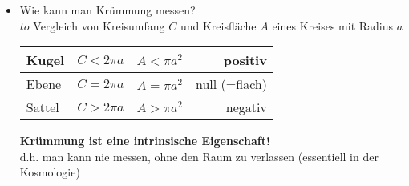 \begin{itemize}
		\begin{figure}[H]
			\centering
			\begin{multicols}{3}
				\begin{figure}[H]
					\centering
					\vspace{0.2cm}\\
				\end{figure}
				$C<2\pi a$
				\columnbreak
				\begin{figure}[H]
					\centering
					\vspace{0.2cm}\\
				\end{figure}
				$C=2\pi a$\\\columnbreak
			\end{multicols}
		\end{figure}
	\item Wie kann man Krümmung messen?\\
	$to$ Vergleich von Kreisumfang $C$ und Kreisfläche $A$ eines Kreises mit Radius $a$
		\begin{table}[H]
			\begin{tabular}{l|c|c|r}
				\hline Kugel & $C<2\pi a$ & $A<\pi a^2$ & positiv\\
				\hline Ebene & $C=2\pi a$ & $A=\pi a^2$ & null (=flach)\\
				\hline Sattel & $C>2\pi a$ & $A>\pi a^2$ & negativ \\\hline
			\end{tabular}
		\end{table}
		\noindent\textbf{Krümmung ist eine intrinsische Eigenschaft!}\\
		d.h. man kann nie messen, ohne den \glqq Raum\grqq{} zu verlassen (essentiell in der Kosmologie)
\end{itemize}
